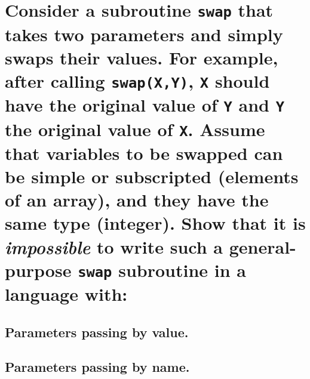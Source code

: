 \documentclass[letterpaper]{article}
\begin{document}
\section{Consider a subroutine \texttt{swap} that takes two parameters and simply swaps their values. For example, after calling \texttt{swap(X,Y)}, \texttt{X} should have the original value of \texttt{Y} and \texttt{Y} the original value of \texttt{X}. Assume that variables to be swapped can be simple or subscripted (elements of an array), and they have the same type (integer). Show that it is \textit{impossible} to write such a general-purpose \texttt{swap} subroutine in a language with:}
\subsection{Parameters passing by value.}
\subsection{Parameters passing by name.}
\end{document}
